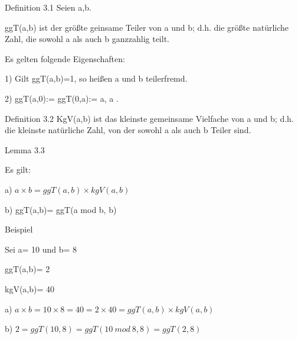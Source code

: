 \documentclass[10pt]{beamer}
\begin{document}
\begin{frame}{Definition 3.1}
    Seien a,b\in {}. 

\noindent ggT(a,b) ist der größte geinsame Teiler von a und b; d.h. die größte natürliche Zahl, die sowohl a als auch b ganzzahlig teilt. 

Es gelten folgende Eigenschaften:

1) Gilt ggT(a,b)=1, so heißen a und b teilerfremd.

2) ggT(a,0):= ggT(0,a):= a,  \forall a \in {}.
\end{frame}

\begin{frame}{Definition 3.2}
 KgV(a,b) ist das kleinste gemeinsame Vielfache von a und b; d.h. die kleinste natürliche Zahl, von der sowohl a als auch b Teiler sind.
    
\end{frame}

\begin{frame}{Lemma 3.3}

Es gilt: 

\vspace{0.3cm}
a) $a\times b = ggT(a,b) \times kgV(a,b)$


\noindent b) ggT(a,b)= ggT(a mod b, b)

\end{frame}

\begin{frame}{Beispiel}

Sei a= 10 und b= 8

ggT(a,b)= 2

kgV(a,b)= 40

\vspace{0,5cm}

a) $a \times b= 10 \times 8= 40= 2\times 40 = ggT(a,b) \times kgV(a,b)$

b) $2= ggT(10,8) = ggT (10 \ mod \ 8,8) = ggT(2,8)$
    
\end{frame}

\end{document}
